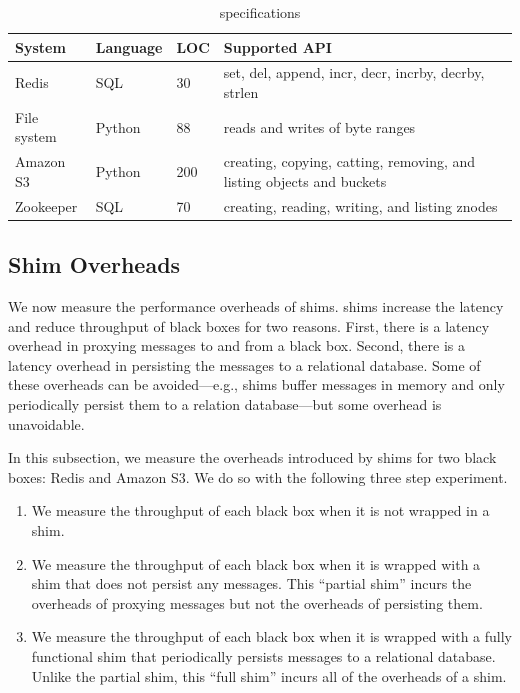 \begin{table}[t]
  \caption{\fluent{} \watprovenance{} specifications}
  \begin{tabular}{lllp{3.9cm}}
    \toprule
    System      & Language & LOC & Supported API                                                         \\\midrule
    Redis       & SQL      & 30  & set, del, append, incr, decr, incrby, decrby, strlen                  \\
    File system & Python   & 88  & reads and writes of byte ranges                                       \\
    Amazon S3   & Python   & 200 & creating, copying, catting, removing, and listing objects and buckets \\
    Zookeeper   & SQL      & 70  & creating, reading, writing, and listing znodes                        \\
    \bottomrule
  \end{tabular}
\end{table}

\subsection{Shim Overheads}
We now measure the performance overheads of \fluent{} shims. \fluent{} shims
increase the latency and reduce throughput of black boxes for two reasons.
First, there is a latency overhead in proxying messages to and from a black
box. Second, there is a latency overhead in persisting the messages to a
relational database.  Some of these overheads can be avoided---e.g., \fluent{}
shims buffer messages in memory and only periodically persist them to a
relation database---but some overhead is unavoidable.

In this subsection, we measure the overheads introduced by \fluent{} shims for
two black boxes: Redis and Amazon S3. We do so with the following three step
experiment.
\begin{enumerate}
  \item
    We measure the throughput of each black box when it is not wrapped in a
    \fluent{} shim.
  \item
    We measure the throughput of each black box when it is wrapped with a
    \fluent{} shim that does not persist any messages. This ``partial shim''
    incurs the overheads of proxying messages but not the overheads of
    persisting them.
  \item
    We measure the throughput of each black box when it is wrapped with a fully
    functional \fluent{} shim that periodically persists messages to a
    relational database. Unlike the partial shim, this ``full shim'' incurs all
    of the overheads of a \fluent{} shim.
\end{enumerate}


